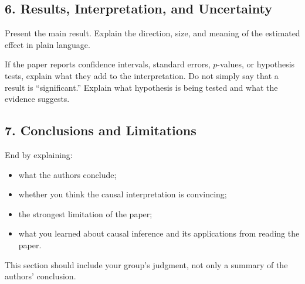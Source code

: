 \documentclass[12pt]{article}
\begin{document}
\subsection*{6. Results, Interpretation, and Uncertainty}

Present the main result. Explain the direction, size, and meaning of the estimated effect in plain language.

If the paper reports confidence intervals, standard errors, $p$-values, or hypothesis tests, explain what they add to the interpretation. Do not simply say that a result is ``significant.'' Explain what hypothesis is being tested and what the evidence suggests.

\subsection*{7. Conclusions and Limitations}

End by explaining:

\begin{itemize}
    \item what the authors conclude;
    \item whether you think the causal interpretation is convincing;
    \item the strongest limitation of the paper;
    \item what you learned about causal inference and its applications from reading the paper.
\end{itemize}

This section should include your group's judgment, not only a summary of the authors' conclusion.




\end{document}
